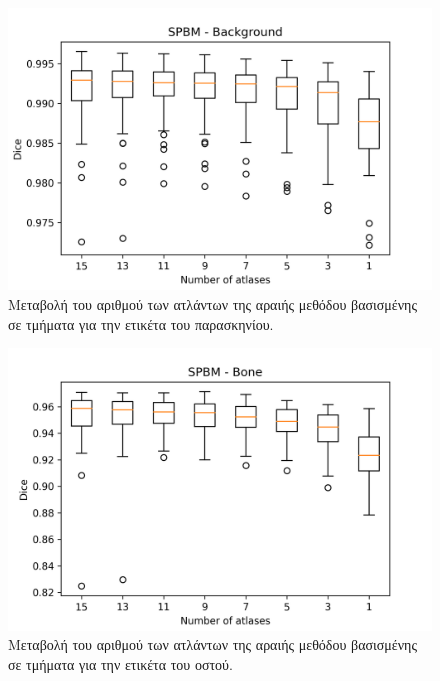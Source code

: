 \documentclass[a4paper,12pt]{article}
\begin{document}
\begin{figure}[H]
    \centering
    \includegraphics[width=0.85\linewidth]{SPBM_Number_of_atlases_Background_plot.png}
    \caption{Μεταβολή του αριθμού των ατλάντων της αραιής μεθόδου βασισμένης σε
             τμήματα για την ετικέτα του παρασκηνίου.}
    \label{fig:SPBM:atlases:1}
\end{figure}

\begin{figure}[H]
    \centering
    \includegraphics[width=0.85\linewidth]{SPBM_Number_of_atlases_Bone_plot.png}
    \caption{Μεταβολή του αριθμού των ατλάντων της αραιής μεθόδου βασισμένης σε
             τμήματα για την ετικέτα του οστού.}
    \label{fig:SPBM:atlases:2}
\end{figure}
\end{document}
